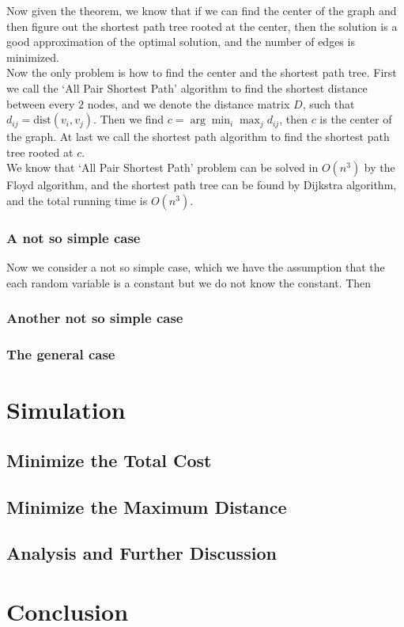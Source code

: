 \documentclass{article}
\theoremstyle{plain}
\theoremstyle{definition}
\theoremstyle{remark}
\begin{document}
    Now given the theorem, we know that if we can find the center of the graph and then figure out the shortest path tree rooted at the center, then the solution is a good approximation of the optimal solution, and the number of edges is minimized.\\

    Now the only problem is how to find the center and the shortest path tree. First we call the `All Pair Shortest Path' algorithm to find the shortest distance between every $2$ nodes, and we denote the distance matrix $D$, such that $d_{ij} = \text{dist}(v_i,v_j)$. Then we find $c = \arg\min_{i}\max_j d_{ij}$, then $c$ is the center of the graph. At last we call the shortest path algorithm to find the shortest path tree rooted at $c$.\\

    We know that `All Pair Shortest Path' problem can be solved in $O(n^3)$ by the Floyd algorithm, and the shortest path tree can be found by Dijkstra algorithm, and the total running time is $O(n^3)$.

    \subsubsection{A not so simple case}
    Now we consider a not so simple case, which we have the assumption that the each random variable is a constant but we do not know the constant. Then 

    \subsubsection{Another not so simple case}

    \subsubsection{The general case}

    \section{Simulation}
    \subsection{Minimize the Total Cost}

    \subsection{Minimize the Maximum Distance}

    \subsection{Analysis and Further Discussion}

    \section{Conclusion}

    \newpage
    
    

    
    
\end{document}
